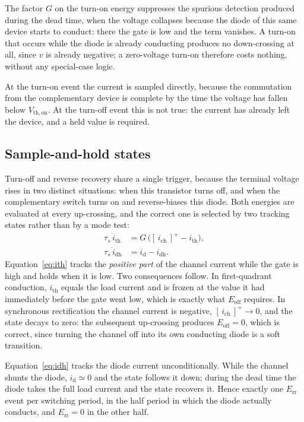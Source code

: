 \documentclass[11pt,a4paper]{article}
\newcommand{\Eoff}{E_\mathrm{off}}
\newcommand{\Err}{E_\mathrm{rr}}
\begin{document}
The factor $G$ on the turn-on energy suppresses the spurious detection produced
during the dead time, when the voltage collapses because the diode of this same
device starts to conduct: there the gate is low and the term vanishes. A turn-on
that occurs while the diode is already conducting produces no down-crossing at
all, since $v$ is already negative; a zero-voltage turn-on therefore costs
nothing, without any special-case logic.

At the turn-on event the current is sampled directly, because the commutation
from the complementary device is complete by the time the voltage has fallen
below $V_\mathrm{th,on}$. At the turn-off event this is not true: the current has
already left the device, and a held value is required.

\subsection{Sample-and-hold states}

Turn-off and reverse recovery share a single trigger, because the terminal
voltage rises in two distinct situations: when this transistor turns off, and
when the complementary switch turns on and reverse-biases this diode. Both
energies are evaluated at every up-crossing, and the correct one is selected by
two tracking states rather than by a mode test:
\begin{align}
  \tau_s\,\dot i_\mathrm{th} &= G\,\big([\,i_\mathrm{ch}\,]^{+} - i_\mathrm{th}\big),
  \label{eq:ith}\\
  \tau_s\,\dot i_\mathrm{dh} &= i_\mathrm{d} - i_\mathrm{dh}.
  \label{eq:idh}
\end{align}
Equation~\eqref{eq:ith} tracks the \emph{positive part} of the channel current
while the gate is high and holds when it is low. Two consequences follow. In
first-quadrant conduction, $i_\mathrm{th}$ equals the load current and is frozen
at the value it had immediately before the gate went low, which is exactly what
$\Eoff$ requires. In synchronous rectification the channel current is negative,
$[\,i_\mathrm{ch}\,]^{+} \to 0$, and the state decays to zero: the subsequent
up-crossing produces $\Eoff = 0$, which is correct, since turning the channel
off into its own conducting diode is a soft transition.

Equation~\eqref{eq:idh} tracks the diode current unconditionally. While the
channel shunts the diode, $i_\mathrm{d}\simeq 0$ and the state follows it down;
during the dead time the diode takes the full load current and the state
recovers it. Hence exactly one $\Err$ event per switching period, in the half
period in which the diode actually conducts, and $\Err = 0$ in the other half.
\end{document}
